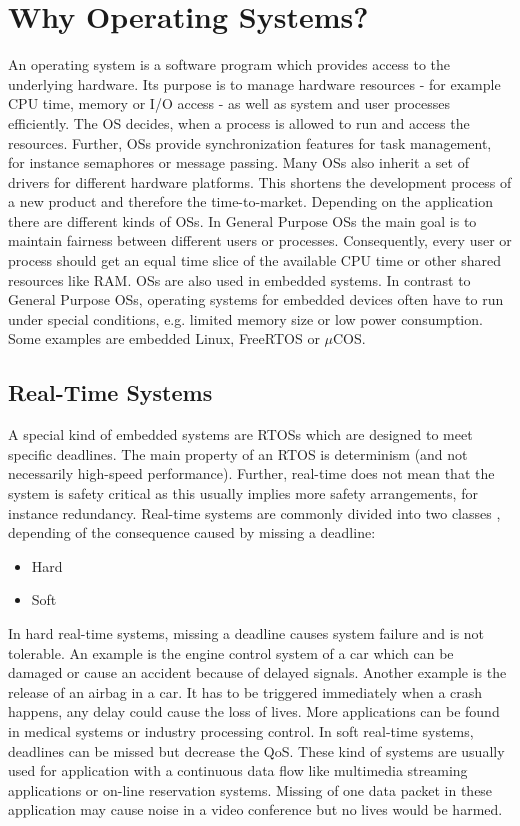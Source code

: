 \section{Why Operating Systems?}
An operating system is a software program which provides access to the underlying hardware. 
Its purpose is to manage hardware resources - for example \ac{CPU} time, memory or \ac{I/O} access - as well as system and user processes efficiently. 
The \ac{OS} decides, when a process is allowed to run and access the resources.
Further, \acp{OS} provide synchronization features for task management, for instance semaphores or message passing.
Many \acp{OS} also inherit a set of drivers for different hardware platforms.
This shortens the development process of a new product and therefore the time-to-market.
Depending on the application there are different kinds of \acp{OS}. 
In General Purpose \acp{OS} the main goal is to maintain fairness between different users or processes. 
Consequently, every user or process should get an equal time slice of the available \ac{CPU} time or other shared resources like \ac{RAM}. 
\acp{OS} are also used in embedded systems. 
In contrast to General Purpose \acp{OS}, operating systems for embedded devices often have to run under special conditions, e.g. limited memory size or low power consumption. 
Some examples are embedded Linux, FreeRTOS or $\mu$COS.

\subsection{Real-Time Systems}
A special kind of embedded systems are \acp{RTOS} which are designed to meet specific deadlines. 
The main property of an \ac{RTOS} is determinism (and not necessarily high-speed performance).  
Further, real-time does not mean that the system is safety critical as this usually implies more safety arrangements, for instance redundancy.
Real-time systems are commonly divided into two classes \cite{stromblad:elfrtoemd}, depending of the consequence caused by missing a deadline:
\begin{itemize}
	\item Hard
	\item Soft
\end{itemize}
In hard real-time systems, missing a deadline causes system failure and is not tolerable.  
An example is the engine control system of a car which can be damaged or cause an accident because of delayed signals.
Another example is the release of an airbag in a car. 
It has to be triggered immediately when a crash happens, any delay could cause the loss of lives. 
More applications can be found in medical systems or industry processing control.  
In soft real-time systems, deadlines can be missed but decrease the \ac{QoS}. 
These kind of systems are usually used for application with a continuous data flow like multimedia streaming applications or on-line reservation systems.
Missing of one data packet in these application may cause noise in a video conference but no lives would be harmed.

